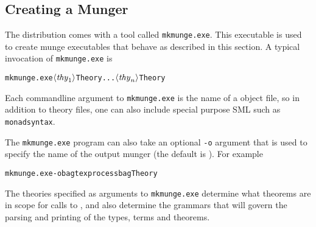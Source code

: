 \subsection{Creating a Munger}
\label{sec:munger-creation}

\newcommand{\mkmunge}{\texttt{mkmunge.exe}}
%
The \HOL{} distribution comes with a tool called \mkmunge.
%
This executable is used to create munge executables that behave as described in this section.
%
A typical invocation of \mkmunge{} is
\begin{alltt}
   \mkmunge \(\langle\mathit{thy}\sb{1}\rangle\)Theory ... \(\langle\mathit{thy}\sb{n}\rangle\)Theory
\end{alltt}
Each commandline argument to \mkmunge{} is the name of a \HOL{} object file, so in addition to theory files, one can also include special purpose SML such as \texttt{monadsyntax}.

The \mkmunge{} program can also take an optional \texttt{-o} argument that is used to specify the name of the output munger (the default is \munge).  For example
\begin{alltt}
   \mkmunge -o bagtexprocess bagTheory
\end{alltt}

The theories specified as arguments to \mkmunge{} determine what theorems are in scope for calls to \holthm, and also determine the grammars that will govern the parsing and printing of the \HOL{} types, terms and theorems.




